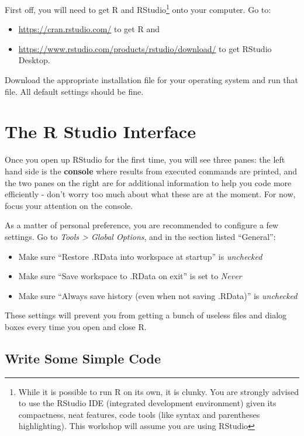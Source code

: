 \documentclass[]{book}
\providecommand{\tightlist}{%
  \setlength{\itemsep}{0pt}\setlength{\parskip}{0pt}}
\let\rmarkdownfootnote\footnote%
\def\footnote{\protect\rmarkdownfootnote}
\theoremstyle{definition}
\theoremstyle{definition}
\theoremstyle{definition}
\theoremstyle{remark}
\begin{document}
First off, you will need to get R and RStudio\footnote{While it is
  possible to run R on its own, it is clunky. You are strongly advised
  to use the RStudio IDE (integrated development environment) given its
  compactness, neat features, code tools (like syntax and parentheses
  highlighting). This workshop will assume you are using RStudio} onto
your computer. Go to:

\begin{itemize}
\tightlist
\item
  \url{https://cran.rstudio.com/} to get R and
\item
  \url{https://www.rstudio.com/products/rstudio/download/} to get
  RStudio Desktop.
\end{itemize}

Download the appropriate installation file for your operating system and
run that file. All default settings should be fine.

\section{The R Studio Interface}\label{the-r-studio-interface}

Once you open up RStudio for the first time, you will see three panes:
the left hand side is the \textbf{console} where results from executed
commands are printed, and the two panes on the right are for additional
information to help you code more efficiently - don't worry too much
about what these are at the moment. For now, focus your attention on the
console.

As a matter of personal preference, you are recommended to configure a
few settings. Go to \emph{Tools \textgreater{} Global Options}, and in
the section listed ``General'':

\begin{itemize}
\tightlist
\item
  Make sure ``Restore .RData into workspace at startup'' is
  \emph{unchecked}
\item
  Make sure ``Save workspace to .RData on exit'' is set to \emph{Never}
\item
  Make sure ``Always save history (even when not saving .RData)'' is
  \emph{unchecked}
\end{itemize}

These settings will prevent you from getting a bunch of useless files
and dialog boxes every time you open and close R.

\subsection{Write Some Simple Code}\label{write-some-simple-code}
\end{document}

